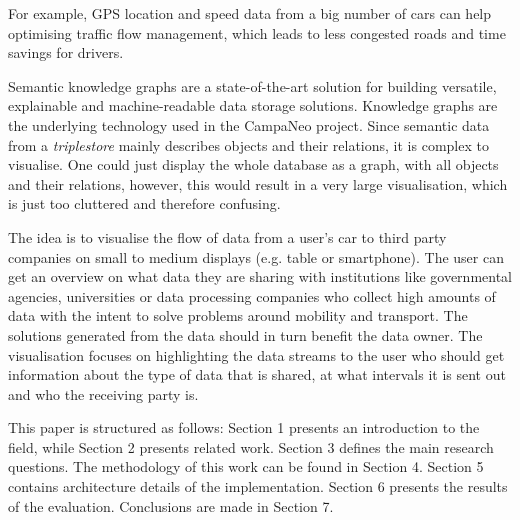   For example, GPS location and speed data from a big number of cars can help
  optimising traffic flow management, which leads to less congested roads and
  time savings for drivers.

  Semantic knowledge graphs are a state-of-the-art solution for building
  versatile, explainable and machine-readable data storage solutions. Knowledge
  graphs are the underlying technology used in the CampaNeo project.  Since
  semantic data from a \textit{triplestore} mainly describes objects and their
  relations, it is complex to visualise. One could just display the whole
  database as a graph, with all objects and their relations, however, this
  would result in a very large visualisation, which is just too cluttered and
  therefore confusing. %

  The idea is to visualise the flow of data from a user's car to third party
  companies on small to medium displays (e.g. table or smartphone). The user
  can get an overview on what data they are sharing with institutions like
  governmental agencies, universities or data processing companies who collect
  high amounts of data with the intent to solve problems around mobility and
  transport. The solutions generated from the data should in turn benefit the
  data owner. The visualisation focuses on highlighting the data streams to
  the user who should get information about the type of data that is shared,
  at what intervals it is sent out and who the receiving party is.

  This paper is structured as follows: Section 1 presents an introduction to
  the field, while Section 2 presents related work. Section 3 defines the main
  research questions. The methodology of this work can be found in Section 4.
  Section 5 contains architecture details of the implementation.  Section 6
  presents the results of the evaluation. Conclusions are made in Section 7.

